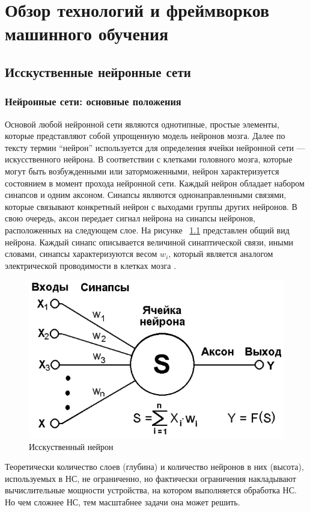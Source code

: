 \documentclass[a4paper,english,russian]{G2-105}
\begin{document}
\chapter{Обзор технологий и фреймворков машинного обучения}


\section{Исскуственные нейронные сети}
\subsection{Нейронные сети: основные положения}
\par Основой любой нейронной сети являются однотипные, простые элементы, которые представляют собой упрощенную модель нейронов мозга. Далее по тексту термин “нейрон” используется для определения ячейки нейронной сети --- искусственного нейрона. В соответствии с клетками головного мозга, которые могут быть возбужденными или заторможенными, нейрон характеризуется состоянием в момент прохода нейронной сети. Каждый нейрон обладает набором синапсов и одним аксоном. Синапсы являются однонаправленными связями, которые связывают конкретный нейрон с выходами группы других нейронов. В свою очередь, аксон передает сигнал нейрона на синапсы нейронов, расположенных на следующем слое. На рисунке ~\ref{neuron} представлен общий вид нейрона. Каждый синапс описывается величиной синаптической связи, иными словами, синапсы характеризуются весом $w_i$, который является аналогом электрической проводимости в клетках мозга \cite{4}.
\begin{figure}
	\begin{center}
    		\includegraphics[width=0.6\linewidth]{neuron.png}
    		\caption{Исскуственный нейрон}
		\label{neuron}
	\end{center}
\end{figure}
\par Теоретически количество слоев (глубина) и количество нейронов в них (высота), используемых в НС, не ограниченно, но фактически ограничения накладывают вычислительные мощности устройства, на котором выполняется обработка НС. Но чем сложнее НС, тем масштабнее задачи она может решить. 
\end{document}
